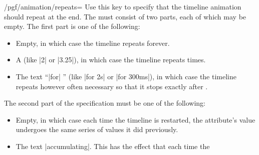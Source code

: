 \begin{key}{/pgf/animation/repeats=}
    Use this key to specify that the timeline animation should repeat at the
    end. The  must consist of two parts, each of which may
    be empty. The first part is one of the following:
    \begin{itemize}
        \item Empty, in which case the timeline repeats forever.
\begin{codeexample}[
    preamble={\usepgfmodule{animations}},
    animation list={1,2,3,4,5},
]
\end{codeexample}
        \item A  (like |2| or |3.25|), in which case the timeline
            repeats  times.
\begin{codeexample}[
    preamble={\usepgfmodule{animations}},
    animation list={1,2,3,4,5},
]
\end{codeexample}
        \item The text ``|for| '' (like |for 2s| or |for 300ms|), in
            which case the timeline repeats however often necessary so that it
            stops exactly after .
\begin{codeexample}[
    preamble={\usepgfmodule{animations}},
    animation list={1,2,3,4,5},
]
\end{codeexample}
    \end{itemize}
    The second part of the specification must be one of the following:
    \begin{itemize}
        \item Empty, in which case each time the timeline is restarted, the
            attribute's value undergoes the same series of values it did
            previously.
        \item The text |accumulating|. This has the effect that each time the

\end{itemize}
\end{key}
